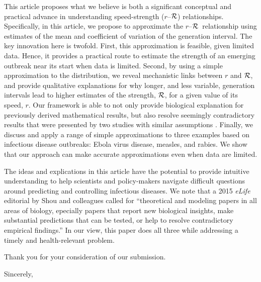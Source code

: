 \documentclass[12pt]{letter}
\newcommand{\rR}{\mbox{$r$--$\cal R$}}
\newcommand{\RR}{\ensuremath{{\cal R}}}
\begin{document}
\begin{letter}{
}
This article proposes what we believe is both a significant conceptual and practical advance in understanding speed-strength (\rR) relationships. Specifically, in this article, we propose to approximate the \rR\ relationship using estimates of the mean and coefficient of variation of the generation interval. The key innovation here is twofold. First, this approximation is feasible, given limited data. Hence, it provides a practical route to estimate the strength of an emerging outbreak near its start when data is limited. Second, by using a simple approximation to the distribution, we reveal mechanistic links between $r$ and \RR, and provide qualitative explanations for why longer, and less variable, generation intervals lead to higher estimates of the strength, \RR, for a given value of its speed, $r$.
Our framework is able to not only provide biological explanation for previously derived mathematical results, but also resolve seemingly contradictory results that were presented by two studies with similar assumptions \cite{wearing2005appropriate, roberts2007model}.
Finally, we discuss and apply a range of simple approximations to three examples based on infectious disease outbreaks: Ebola virus disease, measles, and rabies. 
We show that our approach can make accurate approximations even when data are limited. 

The ideas and explications in this article have the potential to provide intuitive understanding to help scientists and policy-makers navigate difficult questions around predicting and controlling infectious diseases.
We note that a 2015 \emph{eLife} editorial by Shou and colleagues \cite{shou2015theory} called for ``theoretical and modeling papers in all areas of biology, epecially papers that report new biological insights, make substantial predictions that can be tested, or help to resolve contradictory empirical findings.''
In our view, this paper does all three while addressing a timely and health-relevant problem.

Thank you for your consideration of our submission.

\closing{Sincerely,}



\end{letter}
\end{document}
